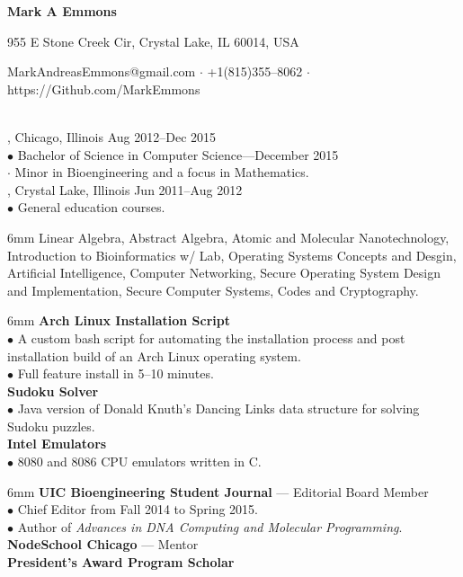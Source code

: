 \documentclass[11pt]{article}
\newenvironment{info}{\begin{adjustwidth}{6mm}{}}{\end{adjustwidth}}
\begin{document}

\centerline{\LARGE \bf Mark A Emmons}
\centerline{955 E Stone Creek Cir, Crystal Lake, IL 60014, USA}
\centerline{MarkAndreasEmmons@gmail.com $\cdot$ +1(815)355--8062 $\cdot$ https://Github.com/MarkEmmons}

 \\
, Chicago, Illinois \hfill Aug 2012--Dec 2015 \\
\indent $\bullet$ Bachelor of Science in Computer Science---December 2015 \\
\indent \indent $\cdot$ Minor in Bioengineering and a focus in Mathematics. \\
, Crystal Lake, Illinois \hfill Jun 2011--Aug 2012 \\
\indent $\bullet$ General education courses.

\begin{info}
Linear Algebra, Abstract Algebra, Atomic and Molecular Nanotechnology, Introduction to Bioinformatics w/ Lab, Operating Systems Concepts and Desgin, Artificial Intelligence, Computer Networking, Secure Operating System Design and Implementation, Secure Computer Systems, Codes and Cryptography.
\end{info}

\begin{info}
{\bf Arch Linux Installation Script} \\
$\bullet$ A custom bash script for automating the installation process and post installation build of an Arch Linux operating system. \\
$\bullet$ Full feature install in 5--10 minutes. \\
{\bf Sudoku Solver} \\
$\bullet$ Java version of Donald Knuth's Dancing Links data structure for solving Sudoku puzzles. \\
{\bf Intel Emulators} \\
$\bullet$ 8080 and 8086 CPU emulators written in C.
\end{info}

\begin{info}
{\bf UIC Bioengineering Student Journal} --- Editorial Board Member \\
$\bullet$ Chief Editor from Fall 2014 to Spring 2015. \\
$\bullet$ Author of {\it Advances in DNA Computing and Molecular Programming}. \\
{\bf NodeSchool Chicago} --- Mentor \\
{\bf President's Award Program Scholar}
\end{info}
\end{document}
